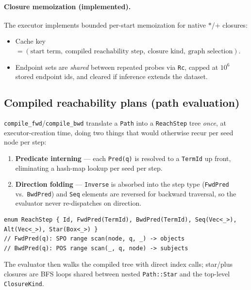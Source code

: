 \documentclass[11pt]{article}
\newcommand{\code}[1]{\texttt{#1}}
\theoremstyle{definition}
\begin{document}
\paragraph{Closure memoization (implemented).} The executor implements bounded
per-start memoization for native $*$/$+$ closures:
\begin{itemize}[leftmargin=1.4em]
  \item Cache key $=(\text{start term},\ \text{compiled reachability step},\
  \text{closure kind},\ \text{graph selection})$.
  \item Endpoint sets are \emph{shared} between repeated probes via \code{Rc},
  capped at $10^6$ stored endpoint ids, and cleared if inference extends the
  dataset.
\end{itemize}

\subsection{Compiled reachability plans (path evaluation)}
\code{compile\_fwd}/\code{compile\_bwd} translate a \code{Path} into a
\code{ReachStep} tree \emph{once}, at executor-creation time, doing two things
that would otherwise recur per seed node per step:
\begin{enumerate}[leftmargin=1.6em]
  \item \textbf{Predicate interning} --- each \code{Pred(q)} is resolved to a
  \code{TermId} up front, eliminating a hash-map lookup per seed per step.
  \item \textbf{Direction folding} --- \code{Inverse} is absorbed into the step
  type (\code{FwdPred} vs.\ \code{BwdPred}) and \code{Seq} elements are reversed
  for backward traversal, so the evaluator never re-dispatches on direction.
\end{enumerate}
\begin{lstlisting}
enum ReachStep { Id, FwdPred(TermId), BwdPred(TermId), Seq(Vec<_>), Alt(Vec<_>), Star(Box<_>) }
// FwdPred(q): SPO range scan(node, q, _) -> objects
// BwdPred(q): POS range scan(_, q, node) -> subjects
\end{lstlisting}
The evaluator then walks the compiled tree with direct index calls; star/plus
closures are BFS loops shared between nested \code{Path::Star} and the top-level
\code{ClosureKind}.
\end{document}
